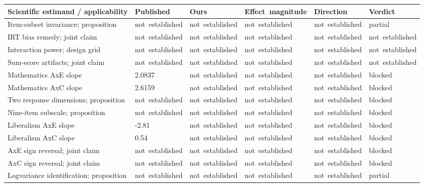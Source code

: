 \documentclass[11pt]{article}
\renewcommand{\arraystretch}{1.25}
\begin{document}
{\fontsize{8}{9}\selectfont
\setlength{\tabcolsep}{2.2pt}\renewcommand{\arraystretch}{1.17}
\begin{tabular}{@{}p{156pt}p{57pt}p{57pt}p{74pt}p{62pt}p{57pt}@{}}
\toprule Scientific estimand / applicability & Published & Ours & \mbox{Effect magnitude} & Direction & Verdict\\\midrule
Item-subset invariance; proposition & \mbox{not established} & \mbox{not established} & \mbox{not established} & \mbox{not established} & partial\\
IRT bias remedy; joint claim & \mbox{not established} & \mbox{not established} & \mbox{not established} & \mbox{not established} & \mbox{not established}\\
Interaction power; design grid & \mbox{not established} & \mbox{not established} & \mbox{not established} & \mbox{not established} & \mbox{not established}\\
Sum-score artifacts; joint claim & \mbox{not established} & \mbox{not established} & \mbox{not established} & \mbox{not established} & \mbox{not established}\\
Mathematics AxE slope & 2.0837 & \mbox{not established} & \mbox{not established} & \mbox{not established} & blocked\\
Mathematics AxC slope & 2.6159 & \mbox{not established} & \mbox{not established} & \mbox{not established} & blocked\\
Two response dimensions; proposition & \mbox{not established} & \mbox{not established} & \mbox{not established} & \mbox{not established} & blocked\\
Nine-item subscale; proposition & \mbox{not established} & \mbox{not established} & \mbox{not established} & \mbox{not established} & blocked\\
Liberalism AxE slope & -2.81 & \mbox{not established} & \mbox{not established} & \mbox{not established} & blocked\\
Liberalism AxC slope & 0.54 & \mbox{not established} & \mbox{not established} & \mbox{not established} & blocked\\
AxE sign reversal; joint claim & \mbox{not established} & \mbox{not established} & \mbox{not established} & \mbox{not established} & blocked\\
AxC sign reversal; joint claim & \mbox{not established} & \mbox{not established} & \mbox{not established} & \mbox{not established} & blocked\\
Logvariance identification; proposition & \mbox{not established} & \mbox{not established} & \mbox{not established} & \mbox{not established} & partial\\

\end{tabular}}
\end{document}
